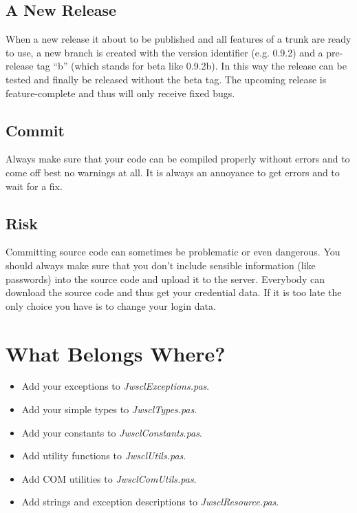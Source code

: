 \documentclass[a4paper,oneside,10pt]{article}
\begin{document}
\subsection{A New Release}
When a new release it about to be published and all features of a trunk are ready to use, a new branch is created with the version identifier (e.g. 0.9.2) and a pre-release tag "`b"' (which stands for beta like 0.9.2b). In this way the release can be tested and finally be released without the beta tag. The upcoming release is feature-complete and thus will only receive fixed bugs.

\subsection{Commit}
Always make sure that your code can be compiled properly without errors and to come off best no warnings at all. It is always an annoyance to get errors and to wait for a fix.

\subsection{Risk}
Committing source code can sometimes be problematic or even dangerous. You should always make sure that you don't include sensible information (like passwords) into the source code and upload it to the server. Everybody can download the source code and thus get your credential data. If it is too late the only choice you have is to change your login data.

\section{What Belongs Where?}\label{Whatbelongswhere}
\begin{itemize}
	\item Add your exceptions to \textit{JwsclExceptions.pas}.
  \item Add your simple types to \textit{JwsclTypes.pas}.
  \item Add your constants to \textit{JwsclConstants.pas}.
  \item Add utility functions to \textit{JwsclUtils.pas}.
  \item Add COM utilities to \textit{JwsclComUtils.pas}.
  \item Add strings and exception descriptions to \textit{JwsclResource.pas}.
\end{itemize}
\end{document}
